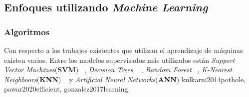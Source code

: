 	\subsection{Enfoques utilizando \emph{Machine Learning}}
		\subsubsection{Algoritmos}
			Con respecto a los trabajos existentes que utilizan el aprendizaje de máquinas existen varios. Entre los modelos supervisados
			más utilizados están \emph{Support Vector Machines}(\textbf{SVM}) ~, \emph{Decision Trees} ~ , \emph{Random Forest} ~, \emph{K-Nearest Neighboors}(\textbf{KNN})
			~ y \emph{Artificial Neural Networks}(\textbf{ANN}) \brackcite
			{kulkarni2014pothole, pawar2020efficient, gonzalez2017learning}.

